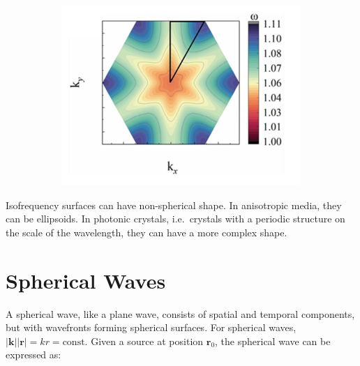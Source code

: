 \documentclass[
  a4paper,
]{book}
\begin{document}
\begin{figure}
\begin{minipage}{0.33\linewidth}
\begin{figure}[H]
{}


\end{figure}%

\end{minipage}%
%
\begin{minipage}{0.33\linewidth}

\begin{figure}[H]

{\centering \includegraphics[width=1\linewidth,height=\textheight,keepaspectratio]{wave-optics/img/pc_iso.png}

}


\end{figure}%

\end{minipage}%

\end{figure}%

Isofrequency surfaces can have non-spherical shape. In anisotropic
media, they can be ellipsoids. In photonic crystals, i.e.~crystals with
a periodic structure on the scale of the wavelength, they can have a
more complex shape.

\section{Spherical Waves}\label{spherical-waves}

A spherical wave, like a plane wave, consists of spatial and temporal
components, but with wavefronts forming spherical surfaces. For
spherical waves, \(|\mathbf{k}||\mathbf{r}|=kr=\text{const}\). Given a
source at position \(\mathbf{r}_0\), the spherical wave can be expressed
as:
\end{document}
